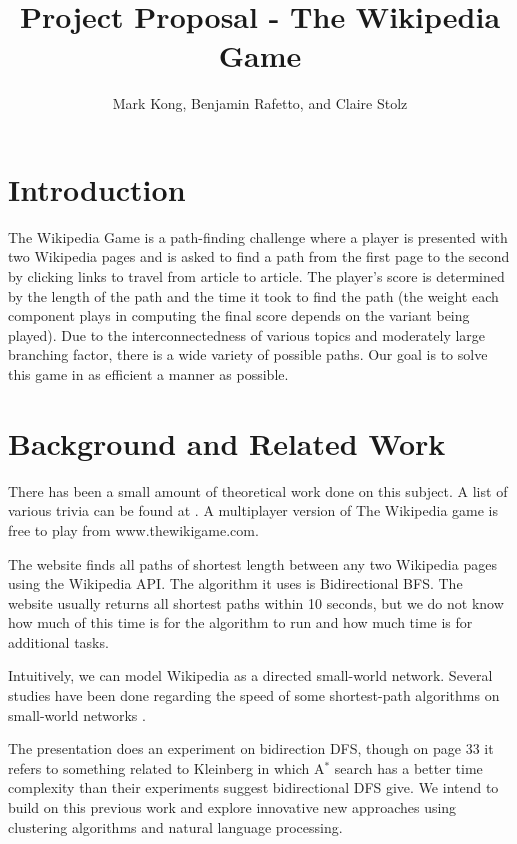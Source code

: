 \documentclass[11pt]{article}
\title{Project Proposal - The Wikipedia Game}
\author{Mark Kong, Benjamin Rafetto, and Claire Stolz}
\begin{document}
\maketitle{}


\section{Introduction}
The Wikipedia Game is a path-finding challenge where a player is presented with two Wikipedia pages and is asked to find a path from the first page to the second by clicking links to travel from article to article. The player's score is determined by the length of the path and the time it took to find the path (the weight each component plays in computing the final score depends on the variant being played). Due to the interconnectedness of various topics and moderately large branching factor, there is a wide variety of possible paths. Our goal is to solve this game in as efficient a manner as possible.

\section{Background and Related Work}

There has been a small amount of theoretical work done on this subject. A list of various trivia can be found at \cite{sixdegreeswiki}. A multiplayer version of The Wikipedia game is free to play from www.thewikigame.com.

The website \cite{sixdegrees} finds all paths of shortest length between any two Wikipedia pages using the Wikipedia API.  The algorithm it uses is Bidirectional BFS.  The website usually returns all shortest paths within 10 seconds, but we do not know how much of this time is for the algorithm to run and how much time is for additional tasks.

Intuitively, we can model Wikipedia as a directed small-world network.  Several studies have been done regarding the speed of some shortest-path algorithms on small-world networks  \cite{Small-world_routing} \cite{princeton}.

The presentation \cite{princeton} does an experiment on bidirection DFS, though on page 33 it refers to something related to Kleinberg in which A$^*$ search has a better time complexity than their experiments suggest bidirectional DFS give.%
We intend to build on this previous work and explore innovative new approaches using clustering algorithms and natural language processing.
\end{document}
